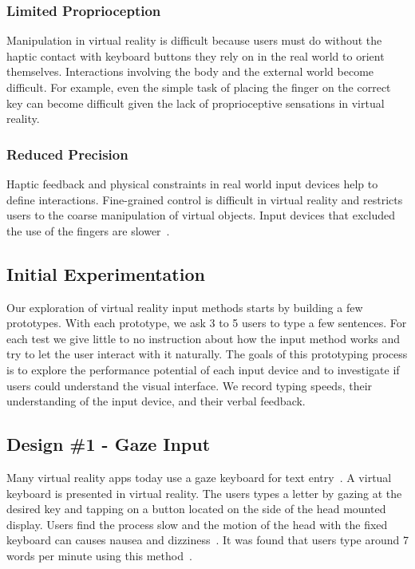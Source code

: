 \subsubsection{Limited Proprioception}
Manipulation in virtual reality is difficult because users must do without the haptic contact with keyboard buttons they rely on in the real world to orient themselves.
Interactions involving the body and the external world become difficult.
For example, even the simple task of placing the finger on the correct key can become difficult given the lack of proprioceptive sensations in virtual reality.

\subsubsection{Reduced Precision}
Haptic feedback and physical constraints in real world input devices help to define interactions. 
Fine-grained control is difficult in virtual reality and restricts users to the coarse manipulation of virtual objects.
Input devices that excluded the use of the fingers are slower~\cite{Zhai:1996:IMG:238386.238534}.  

\subsection{Initial Experimentation}

Our exploration of virtual reality input methods starts by building a few prototypes.
With each prototype, we ask 3 to 5 users to type a few sentences.  
For each test we give little to no instruction about how the input method works and try to let the user interact with it naturally.
The goals of this prototyping process is to explore the performance potential of each input device and to investigate if users could understand the visual interface.
We record typing speeds, their understanding of the input device, and their verbal feedback.

\subsection{Design \#1 - Gaze Input}
Many virtual reality apps today use a gaze keyboard for text entry~\cite{netflix_app_for_oculus}.
A virtual keyboard is presented in virtual reality.
The users types a letter by gazing at the desired key and tapping on a button located on the side of the head mounted display.
Users find the process slow and the motion of the head with the fixed keyboard can causes nausea and dizziness~\cite{atienza2016interaction}.
It was found that users type around 7 words per minute using this method~\cite{majaranta2006effects}.

